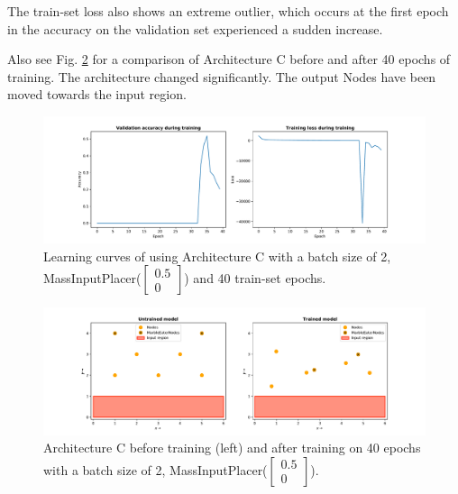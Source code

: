 The train-set loss also shows an extreme outlier, which occurs at the first epoch in the accuracy on the validation set experienced a sudden increase. 

Also see Fig. \ref{fig:arch_c_const_vel_50pc_architecture} for a comparison of Architecture C before and after 40 epochs of training. The architecture changed significantly. The output Nodes have been moved towards the input region.

\begin{figure}[hb]
	\centering
	\includegraphics[scale=0.4]{figures/C_batch1_ConstVelInputPlacer([0.5, 0]])_epoch40_stats.pdf}
	\caption{Learning curves of using Architecture C with 
		a batch size of 2, MassInputPlacer($\begin{bmatrix} 0.5\\0\end{bmatrix}$) and 40 train-set epochs.}
	\label{fig:arch_c_const_vel_50pc_learning_curve}
\end{figure}

\begin{figure}[hb]
	\centering
	\includegraphics[scale=0.4]{figures/C_batch1_ConstVelInputPlacer([0.5, 0]])_epoch40.pdf}
	\caption{Architecture C before training (left) and after training on 40 epochs with 
		a batch size of 2, MassInputPlacer($\begin{bmatrix} 0.5\\0\end{bmatrix}$).}
	\label{fig:arch_c_const_vel_50pc_architecture}
\end{figure}

\clearpage